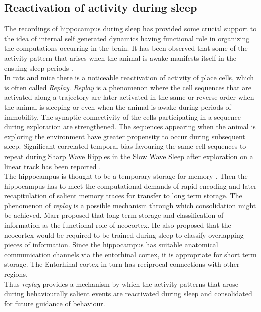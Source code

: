 \subsection{Reactivation of activity during sleep}
\label{replay}
The recordings of hippocampus during sleep has provided some crucial support to the idea of internal self generated dynamics having functional role in organizing the computations occurring in the brain. It has been observed that some of the activity pattern that arises when the animal is awake manifests itself in the ensuing sleep periods \cite{Wilson1994}. \\
In rats and mice there is a noticeable reactivation of activity of place cells, which is often called \emph{Replay}. \emph{Replay} is a phenomenon where the cell sequences that are activated along a trajectory are later activated in the same or reverse order when the animal is sleeping or even when the animal is awake during periods of immobility. The synaptic connectivity of the cells participating in a sequence during exploration are strengthened.  The sequences appearing when the animal is exploring the environment have greater propensity to occur during subsequent sleep. Significant correlated temporal bias favouring the same cell sequences to repeat during Sharp Wave Ripples in the Slow Wave Sleep after exploration on a linear track has been reported \cite{Skaggs1996b}. \\
The hippocampus is thought to be a temporary storage for memory \cite{Buzsaki1989, Battaglia2011}. Then the hippocampus has to meet the computational demands of rapid encoding and later recapitulation of salient memory traces for transfer to long term storage. The phenomenon of \emph{replay} is a possible mechanism through which consolidation might be achieved.  Marr \cite{Marr2007} proposed that long term storage and classification of information as the functional role of neocortex. He also proposed that the neocortex would be required to be trained during sleep to classify overlapping pieces of information. Since the hippocampus has suitable anatomical communication channels via the entorhinal cortex, it is appropriate for short term storage. The Entorhinal cortex in turn has reciprocal connections with other regions. \\

Thus \emph{replay} provides a mechanism by which the activity patterns that arose during behaviourally salient events are reactivated during sleep and consolidated for future guidance of behaviour. \\


